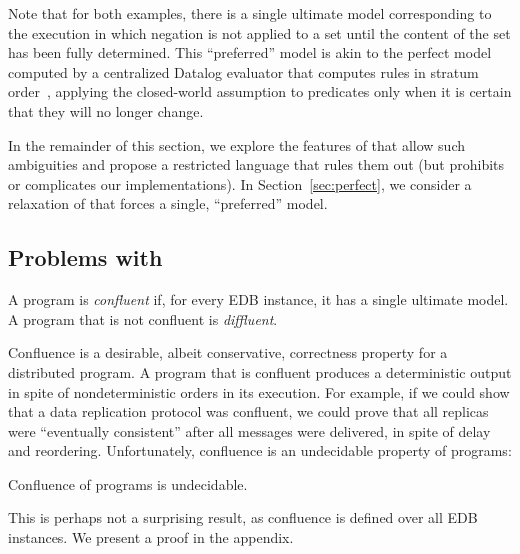 Note that for both examples, there is a single ultimate model corresponding to
the execution in which negation is not applied to a set until the content of the
set has been fully determined.  This ``preferred'' model is akin to the perfect
model computed by a centralized Datalog evaluator that computes rules in stratum
order~\cite{ullman}, applying the closed-world assumption to predicates only
when it is certain that they will no longer change.

In the remainder of this section, we explore the features of \lang that allow
such ambiguities and propose a restricted language \slang that rules them out
(but prohibits or complicates our implementations).  In
Section~\ref{sec:perfect}, we consider a relaxation of \slang that forces a
single, ``preferred'' model.

\subsection{Problems with \large \bf \lang}

\begin{definition}
  A \lang program is {\em confluent} if, for every EDB instance, it has a single ultimate model.  A program that is not confluent is {\em diffluent}.
\end{definition}


Confluence is a desirable, albeit conservative, correctness property for a distributed program.  A program that is
confluent produces a deterministic output in spite of nondeterministic orders in its execution.  For example, if
we could show that a data replication protocol was confluent, we could prove that all replicas were ``eventually consistent''
after all messages were delivered, in spite of delay and reordering.
Unfortunately, confluence is an undecidable property of \lang programs:

\begin{lemma}
\label{lem:confluence-undecidable}
Confluence of \lang programs is undecidable.
\end{lemma}
This is perhaps not a surprising result, as confluence is defined over all EDB instances.  We present a proof in the appendix.


